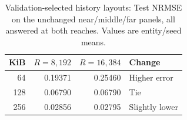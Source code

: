 \begin{table}[t]\caption{Validation-selected history layouts: Test NRMSE on the unchanged near/middle/far panels, all answered at both reaches. Values are entity/seed means.}\label{tab:rq2selected}\centering
\begin{tabular}{@{}rrrl@{}}\toprule KiB & $R=8{,}192$ & $R=16{,}384$ & Change\\\midrule
64 & 0.19371 & 0.25460 & Higher error\\
128 & 0.06790 & 0.06790 & Tie\\
256 & 0.02856 & 0.02795 & Slightly lower\\\bottomrule\end{tabular}\end{table}
